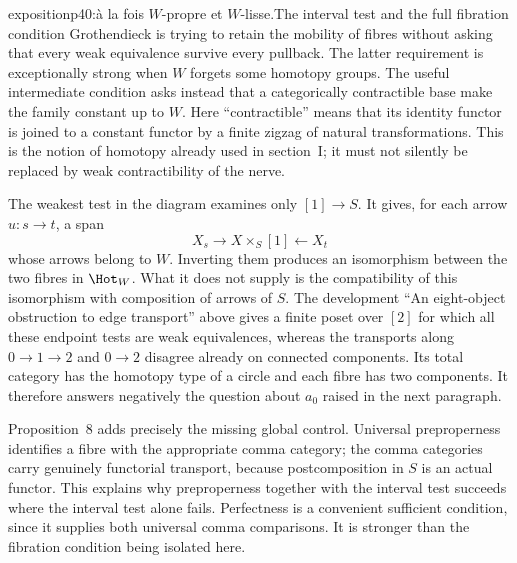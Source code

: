 \begin{dcomment}{exposition}{p40:à la fois $W$-propre et $W$-lisse.}{The interval test and the full fibration condition}
Grothendieck is trying to retain the mobility of fibres without asking that every weak equivalence survive every pullback. The latter requirement is exceptionally strong when $W$ forgets some homotopy groups. The useful intermediate condition asks instead that a categorically contractible base make the family constant up to $W$. Here ``contractible'' means that its identity functor is joined to a constant functor by a finite zigzag of natural transformations. This is the notion of homotopy already used in section~I; it must not silently be replaced by weak contractibility of the nerve.

The weakest test in the diagram examines only $[1]\to S$. It gives, for each arrow $u:s\to t$, a span
\[
 X_s\longrightarrow X\times_S[1]\longleftarrow X_t
\]
whose arrows belong to $W$. Inverting them produces an isomorphism between the two fibres in $\Hot_W$. What it does not supply is the compatibility of this isomorphism with composition of arrows of $S$. The development ``An eight-object obstruction to edge transport'' above gives a finite poset over $[2]$ for which all these endpoint tests are weak equivalences, whereas the transports along $0\to1\to2$ and $0\to2$ disagree already on connected components. Its total category has the homotopy type of a circle and each fibre has two components. It therefore answers negatively the question about $a_0$ raised in the next paragraph.

Proposition~8 adds precisely the missing global control. Universal preproperness identifies a fibre with the appropriate comma category; the comma categories carry genuinely functorial transport, because postcomposition in $S$ is an actual functor. This explains why preproperness together with the interval test succeeds where the interval test alone fails. Perfectness is a convenient sufficient condition, since it supplies both universal comma comparisons. It is stronger than the fibration condition being isolated here.
\end{dcomment}

